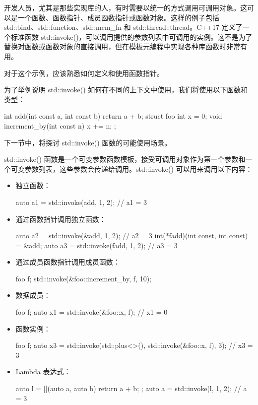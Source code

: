 开发人员，尤其是那些实现库的人，有时需要以统一的方式调用可调用对象。这可以是一个函数、函数指针、成员函数指针或函数对象。这样的例子包括 std::bind、std::function、std::mem\_fn 和 std::thread::thread。C++17 定义了一个标准函数 std::invoke()，可以调用提供的参数列表中可调用的实例。这不是为了替换对函数或函数对象的直接调用，但在模板元编程中实现各种库函数时非常有用。


对于这个示例，应该熟悉如何定义和使用函数指针。

为了举例说明 std::invoke() 如何在不同的上下文中使用，我们将使用以下函数和类型：

\begin{cpp}
int add(int const a, int const b)
{
    return a + b;
}
struct foo
{
    int x = 0;
    void increment_by(int const n) { x += n; }
};
\end{cpp}

下一节中，将探讨 std::invoke() 函数的可能使用场景。


std::invoke() 函数是一个可变参数函数模板，接受可调用对象作为第一个参数和一个可变参数列表，这些参数会传递给调用。std::invoke() 可以用来调用以下内容：

\begin{itemize}
\item
独立函数：

\begin{cpp}
auto a1 = std::invoke(add, 1, 2);   // a1 = 3
\end{cpp}

\item
通过函数指针调用独立函数：

\begin{cpp}
auto a2 = std::invoke(&add, 1, 2);  // a2 = 3
int(*fadd)(int const, int const) = &add;
auto a3 = std::invoke(fadd, 1, 2);  // a3 = 3
\end{cpp}

\item
通过成员函数指针调用成员函数：

\begin{cpp}
foo f;
std::invoke(&foo::increment_by, f, 10);
\end{cpp}

\item
数据成员：

\begin{cpp}
foo f;
auto x1 = std::invoke(&foo::x, f);  // x1 = 0
\end{cpp}

\item
函数实例：

\begin{cpp}
foo f;
auto x3 = std::invoke(std::plus<>(),
    std::invoke(&foo::x, f), 3); // x3 = 3
\end{cpp}

\item
Lambda 表达式：

\begin{cpp}
auto l = [](auto a, auto b) {return a + b; };
auto a = std::invoke(l, 1, 2); // a = 3
\end{cpp}
\end{itemize}

